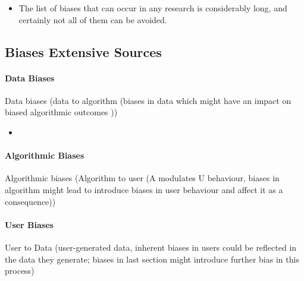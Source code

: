 \begin{refsection}
		\begin{itemize}
			\item The list of biases that can occur in any research is considerably long, and certainly not all of them can be avoided. \autocite{Chakraborty_2024}
		\end{itemize}
		\rawcitationend
		
		\rawcitationstart
		\subsection{Biases Extensive Sources}
		
		\paragraph{Data Biases}
		Data biases (data to algorithm (biases in data which might have an impact on biased algorithmic outcomes \autocite{Mehrabi_2021}))	
		\begin{itemize}
			\item 
		\end{itemize}	
		
		
		\paragraph{Algorithmic Biases}
		
		Algorithmic biases (Algorithm to user (A modulates U behaviour, biases in algorithm might lead to introduce biases in user behaviour and affect it as a consequence)) \autocite{Mehrabi_2021}
		
		\paragraph{User Biases}
		
		User to Data (user-generated data, inherent biases in users could be reflected in the data they generate; biases in last section might introduce further bias in this process) \autocite{Mehrabi_2021}
		

\end{refsection}
